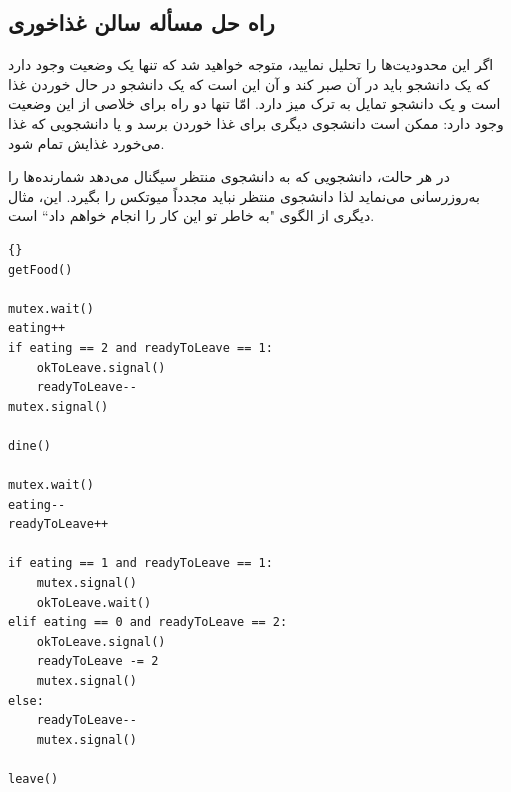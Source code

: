 \documentclass{book}
\newcommand{\clearemptydoublepage}{\newpage\cleardoublepage}
\begin{document}
\clearemptydoublepage
\subsection{راه حل مسأله سالن غذاخوری}

    اگر این محدودیت‌ها را تحلیل نمایید، متوجه خواهید شد که تنها یک وضعیت وجود دارد که یک دانشجو باید در آن صبر کند و آن این است که یک 
    دانشجو در حال خوردن غذا است و یک دانشجو تمایل به ترک میز دارد. امّا تنها دو راه برای خلاصی از این وضعیت وجود دارد:
    ممکن است دانشجوی دیگری برای غذا خوردن برسد و یا دانشجویی که غذا می‌خورد غذایش تمام شود. 

    در هر حالت، دانشجویی که به دانشجوی منتظر سیگنال می‌دهد شمارنده‌ها را به‌روزرسانی می‌نماید لذا دانشجوی منتظر نباید مجدداً میوتکس را بگیرد. 
    این، مثال دیگری از الگوی "به خاطر تو این کار را انجام خواهم داد`` است.

\begin{latin}
\begin{lstlisting}[title=\rl{راه حل مسأله سالن غذاخوری}]{}
getFood()

mutex.wait()
eating++
if eating == 2 and readyToLeave == 1:
    okToLeave.signal()
    readyToLeave--
mutex.signal()

dine()

mutex.wait()
eating--
readyToLeave++

if eating == 1 and readyToLeave == 1:
    mutex.signal()
    okToLeave.wait()
elif eating == 0 and readyToLeave == 2:
    okToLeave.signal()
    readyToLeave -= 2
    mutex.signal()
else:
    readyToLeave--
    mutex.signal()

leave()
\end{lstlisting}
\end{latin}
\end{document}
